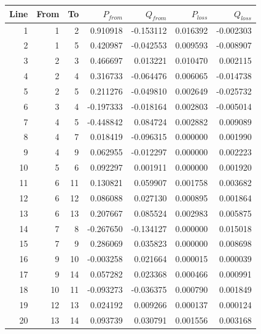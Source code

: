 \begin{tabular*}{\textwidth}{@{\extracolsep{\fill}}rrrrrrr@{}}\toprule
Line & From & To & $P_{from}$ & $Q_{from}$ & $P_{loss}$ & $Q_{loss}$ \\ \midrule
1 & 1 & 2 & 0.910918 & -0.153112 & 0.016392 & -0.002303 \\
2 & 1 & 5 & 0.420987 & -0.042553 & 0.009593 & -0.008907 \\
3 & 2 & 3 & 0.466697 & 0.013221 & 0.010470 & 0.002115 \\
4 & 2 & 4 & 0.316733 & -0.064476 & 0.006065 & -0.014738 \\
5 & 2 & 5 & 0.211276 & -0.049810 & 0.002649 & -0.025732 \\
6 & 3 & 4 & -0.197333 & -0.018164 & 0.002803 & -0.005014 \\
7 & 4 & 5 & -0.448842 & 0.084724 & 0.002882 & 0.009089 \\
8 & 4 & 7 & 0.018419 & -0.096315 & 0.000000 & 0.001990 \\
9 & 4 & 9 & 0.062955 & -0.012297 & 0.000000 & 0.002223 \\
10 & 5 & 6 & 0.092297 & 0.001911 & 0.000000 & 0.001920 \\
11 & 6 & 11 & 0.130821 & 0.059907 & 0.001758 & 0.003682 \\
12 & 6 & 12 & 0.086088 & 0.027130 & 0.000895 & 0.001864 \\
13 & 6 & 13 & 0.207667 & 0.085524 & 0.002983 & 0.005875 \\
14 & 7 & 8 & -0.267650 & -0.134127 & 0.000000 & 0.015018 \\
15 & 7 & 9 & 0.286069 & 0.035823 & 0.000000 & 0.008698 \\
16 & 9 & 10 & -0.003258 & 0.021664 & 0.000015 & 0.000039 \\
17 & 9 & 14 & 0.057282 & 0.023368 & 0.000466 & 0.000991 \\
18 & 10 & 11 & -0.093273 & -0.036375 & 0.000790 & 0.001849 \\
19 & 12 & 13 & 0.024192 & 0.009266 & 0.000137 & 0.000124 \\
20 & 13 & 14 & 0.093739 & 0.030791 & 0.001556 & 0.003168 \\
\bottomrule\end{tabular*}
